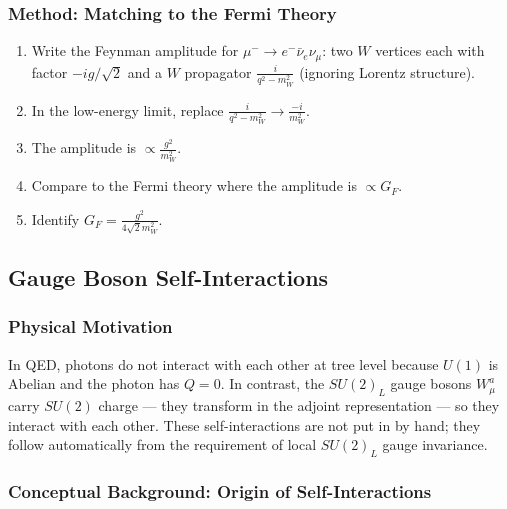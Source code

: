 \subsubsection*{Method: Matching to the Fermi Theory}
\begin{enumerate}
  \item Write the Feynman amplitude for $\mu^-\to e^-\bar\nu_e\nu_\mu$:
        two $W$ vertices each with factor $-ig/\sqrt2$ and a $W$
        propagator $\frac{i}{q^2-m_W^2}$ (ignoring Lorentz structure).
  \item In the low-energy limit, replace $\frac{i}{q^2-m_W^2}\to\frac{-i}{m_W^2}$.
  \item The amplitude is $\propto \frac{g^2}{m_W^2}$.
  \item Compare to the Fermi theory where the amplitude is $\propto G_F$.
  \item Identify $G_F = \frac{g^2}{4\sqrt2 m_W^2}$.
\end{enumerate}

\subsection{Gauge Boson Self-Interactions}\label{subsec:lec19:self}

\subsubsection*{Physical Motivation}

In QED, photons do not interact with each other at tree level because
$U(1)$ is Abelian and the photon has $Q=0$. In contrast, the
$SU(2)_L$ gauge bosons $W^a_\mu$ carry $SU(2)$ charge --- they
transform in the adjoint representation --- so they interact with
each other. These self-interactions are not put in by hand; they
follow automatically from the requirement of local $SU(2)_L$ gauge
invariance.

\subsubsection*{Conceptual Background: Origin of Self-Interactions}

